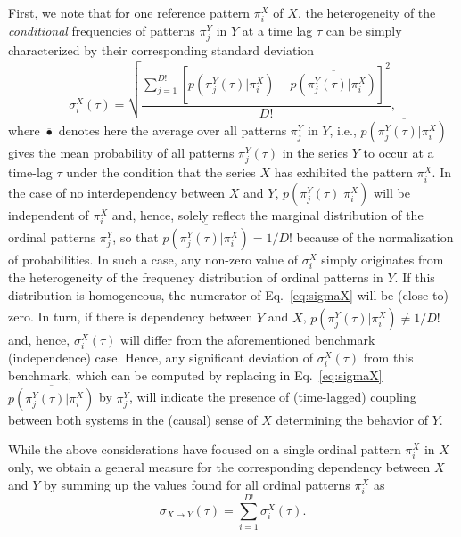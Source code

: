 \documentclass[12pt,aip,cha,reprint,nofootinbib]{revtex4-1}
\begin{document}
First, we note that for one reference pattern $\pi_i^{X}$ of $X$, the heterogeneity of the \emph{conditional} frequencies of patterns $\pi_{j}^{Y}$ in $Y$ at a time lag $\tau$ can be simply characterized by their corresponding standard deviation
\begin{equation}
\sigma_i^{X} (\tau) = \sqrt{\frac{\sum_{j = 1}^{D!} [p(\pi_{j}^{Y}(\tau) | \pi_i^{X}) - \overline{p(\pi_{j}^{Y}(\tau) | \pi_i^{X})}]^{2} }{D!}}, 
\label{eq:sigmaX}
\end{equation}
where $\overline{\bullet}$ denotes here the average over all patterns $\pi_{j}^{Y}$ in $Y$, i.e., $\overline{p(\pi_{j}^{Y}(\tau) | \pi_i^{X})}$ gives the mean probability of all patterns $\pi_{j}^{Y}(\tau)$ in the series $Y$ to occur at a time-lag $\tau$ under the condition that the series $X$ has exhibited the pattern $\pi_i^{X}$. In the case of no interdependency between $X$ and $Y$, $p(\pi_{j}^{Y}(\tau) | \pi_i^{X})$ will be independent of $\pi_i^{X}$ and, hence, solely reflect the marginal distribution of the ordinal patterns $\pi_j^{Y}$, so that $\overline{p(\pi_{j}^{Y}(\tau) | \pi_i^{X})}=1/D!$ because of the normalization of probabilities. In such a case, any non-zero value of $\sigma_i^{X}$ simply originates from the heterogeneity of the frequency distribution of ordinal patterns in $Y$. If this distribution is homogeneous, the numerator of Eq.~\eqref{eq:sigmaX} will be (close to) zero. In turn, if there is dependency between $Y$ and $X$, $\overline{p(\pi_{j}^{Y}(\tau) | \pi_i^{X})}\neq 1/D!$ and, hence, $\sigma_i^{X}(\tau)$ will differ from the aforementioned benchmark (independence) case. Hence, any significant deviation of $\sigma_i^{X}(\tau)$ from this benchmark, which can be computed by replacing in Eq.~\eqref{eq:sigmaX} $\overline{p(\pi_{j}^{Y}(\tau) | \pi_i^{X})}$ by $\pi_j^{Y}$, will indicate the presence of (time-lagged) coupling between both systems in the (causal) sense of $X$ determining the behavior of $Y$.

While the above considerations have focused on a single ordinal pattern $\pi_i^{X}$ in $X$ only, we obtain a general measure for the corresponding dependency between $X$ and $Y$ by summing up the values found for all ordinal patterns $\pi_i^{X}$ as
\begin{equation}
\sigma_{X\to Y} (\tau) = \sum_{i=1}^{D!} \sigma_{i}^{X} (\tau). 
\end{equation}
\end{document}
